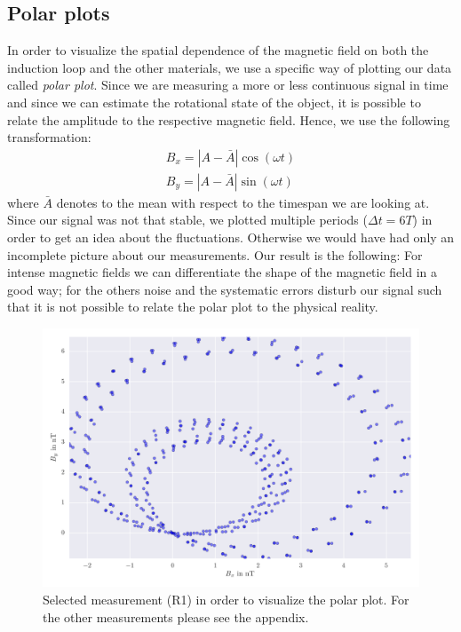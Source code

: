 \subsection{Polar plots}
In order to visualize the spatial dependence of the magnetic field on both the 
induction loop and the other materials, we use a specific way of plotting 
our data called \textit{polar plot}. Since we are measuring a more or less
continuous signal in time and since we can estimate the rotational state
of the object, it is possible to relate the amplitude to the respective magnetic
field. Hence, we use the following transformation:
\begin{align}
    B_x = |A - \bar{A}| \cos(\omega t) \\
    B_y = |A - \bar{A}| \sin(\omega t) 
\end{align}
where $\bar{A}$ denotes to the mean with respect to the timespan we are looking at.
Since our signal was not that stable, we plotted multiple periods ($\Delta t = 6T$) in 
order to get an idea about the fluctuations. Otherwise we would have had only
an incomplete picture about our measurements. Our result is the following:
For intense magnetic fields we can differentiate the shape of the magnetic field
in a good way; for the others noise and the systematic errors disturb our
signal such that it is not possible to relate the polar plot to the physical reality. 
\begin{figure}[H]
    \centering
    \includegraphics[width=1\linewidth]{analysis/figures/polar4_1}
    \caption{Selected measurement (R1) in order to visualize the polar plot.
    For the other measurements please see the appendix.}
    \label{fig:4_1_polar}
\end{figure}

